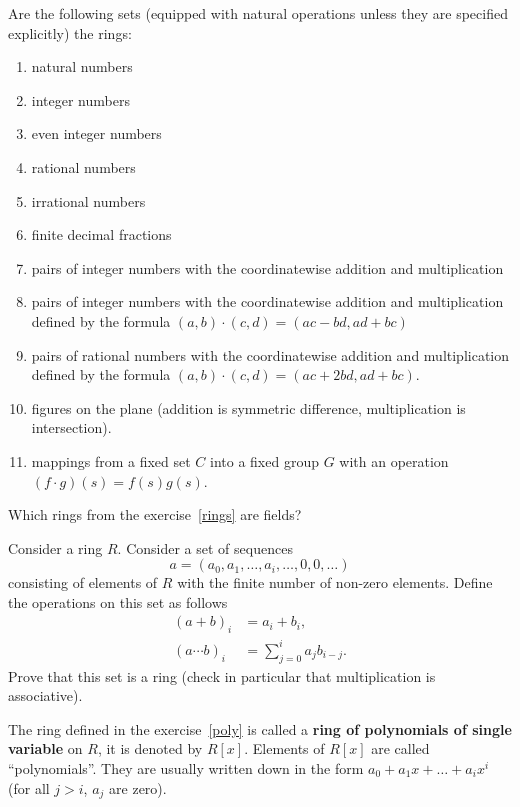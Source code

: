 \documentclass[12pt]{article}
\begin{document}
\begin{zadacha}\label{rings}
  Are the following sets (equipped with natural operations unless they
  are specified explicitly) the rings:
\begin{enumerate}
\item natural numbers
\item integer numbers
\item even integer numbers
\item rational numbers
\item irrational numbers
\item finite decimal fractions
\item pairs of integer numbers with the coordinatewise addition and
multiplication
\item pairs of integer numbers with the coordinatewise addition and
  multiplication defined by the formula
  $(a,b)\cdot(c,d)=(ac-bd,ad+bc)$
\item\sttr\label{sqrt2} pairs of rational numbers with the
coordinatewise addition and multiplication defined by the formula
$(a,b)\cdot(c,d)=(ac+2bd,ad+bc)$.
\item\sttr figures on the plane (addition is symmetric difference,
  multiplication is intersection).
\item\sttr mappings from a fixed set $C$ into a fixed group $G$ with
  an operation $(f \cdot g)(s) = f(s)g(s)$.
\end{enumerate}
\end{zadacha}

\begin{zadacha}
Which rings from the exercise~\ref{rings} are fields?
\end{zadacha}

\begin{zadacha}\label{poly} 
Consider a ring $R$. Consider a set of sequences
$$ 
a=(a_0,a_1,\dots,a_i,\dots,0,0,\dots)
$$
consisting of elements of $R$ with the finite number of non-zero
elements. Define the operations on this set as follows
$$
\begin{aligned}
(a+b)_i &= a_i+b_i,\\
(a \cdots b)_i &= \sum_{j=0}^i a_jb_{i-j}.
\end{aligned}
$$
Prove that this set is a ring (check in particular that multiplication
is associative).
\end{zadacha}

The ring defined in the exercise~\ref{poly} is called a {\bf ring of
  polynomials of single variable} on $R$, it is denoted by $R[x]$.
Elements of $R[x]$ are called ``polynomials''. They are usually
written down in the form $a_0 + a_1x + \dots + a_ix^i$ (for all $j>i$,
$a_j$ are zero).
\end{document}
